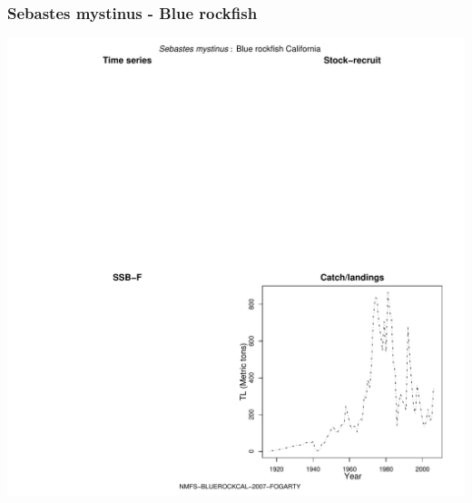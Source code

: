 \subsubsection{Sebastes mystinus - Blue rockfish}
\begin{center}
\includegraphics[width=1.2\textwidth]{../R/figures/NMFS-BLUEROCKCAL-2007-FOGARTY.pdf}
\end{center}

